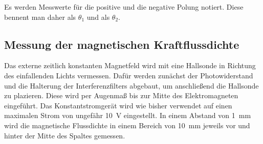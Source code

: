 Es werden Messwerte für die positive und die negative Polung notiert. Diese bennent man daher als $\theta_1$ und als $\theta_2$.

\subsection{Messung der magnetischen Kraftflussdichte}
\label{sec:Kraftflussdichte}

Das externe zeitlich konstanten Magnetfeld wird mit eine Hallsonde in Richtung des einfallenden Lichts vermessen.
Dafür werden zunächst der Photowiderstand und die Halterung der Interferenzfilters abgebaut, um anschließend
die Hallsonde zu plazieren. Diese wird per Augenmaß bis zur Mitte des Elektromagneten eingeführt. Das Konstantstromgerät
wird wie bisher verwendet auf einen maximalen Strom von ungefähr \qty{10}{\volt} eingestellt. In einem Abstand von 
\qty{1}{\milli\meter} wird die magnetische Flussdichte in einem Bereich von \qty{10}{\milli\meter} jeweils vor und hinter
der Mitte des Spaltes gemessen.